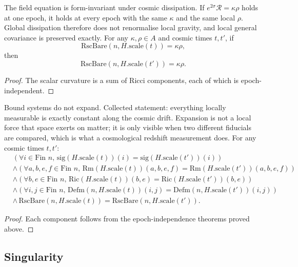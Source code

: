 \begin{theorem}
The field equation is form-invariant under cosmic dissipation. If $e^{2\sigma}\mathcal{R} = \kappa\rho$ holds at one epoch, it holds at every epoch with the same $\kappa$ and the same local $\rho$. Global dissipation therefore does not renormalise local gravity, and local general covariance is preserved exactly. For any $\kappa, \rho \in A$ and cosmic times $t, t'$, if
\[
\text{RscBare}(n, H.\text{scale}(t)) = \kappa \rho,
\]
then
\[
\text{RscBare}(n, H.\text{scale}(t')) = \kappa \rho.
\]
\begin{proof}
The scalar curvature is a sum of Ricci components, each of which is epoch-independent.
\end{proof}
\end{theorem}

\begin{theorem}
Bound systems do not expand. Collected statement: everything locally measurable is exactly constant along the cosmic drift. Expansion is not a local force that space exerts on matter; it is only visible when two different fiducials are compared, which is what a cosmological redshift measurement does. For any cosmic times $t, t'$:
\[
\begin{aligned}
&\left(\forall i \in \text{Fin } n, \, \text{sig}(H.\text{scale}(t))(i) = \text{sig}(H.\text{scale}(t'))(i)\right) \\
&\wedge \left(\forall a, b, e, f \in \text{Fin } n, \, \text{Rm}(H.\text{scale}(t))(a,b,e,f) = \text{Rm}(H.\text{scale}(t'))(a,b,e,f)\right) \\
&\wedge \left(\forall b, e \in \text{Fin } n, \, \text{Ric}(H.\text{scale}(t))(b, e) = \text{Ric}(H.\text{scale}(t'))(b, e)\right) \\
&\wedge \left(\forall i, j \in \text{Fin } n, \, \text{Defm}(n, H.\text{scale}(t))(i, j) = \text{Defm}(n, H.\text{scale}(t'))(i, j)\right) \\
&\wedge \, \text{RscBare}(n, H.\text{scale}(t)) = \text{RscBare}(n, H.\text{scale}(t')).
\end{aligned}
\]
\begin{proof}
Each component follows from the epoch-independence theorems proved above.
\end{proof}
\end{theorem}

\subsection{Singularity}

